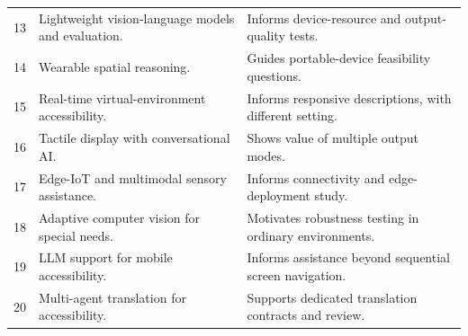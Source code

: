 \documentclass[12pt,a4paper,oneside]{report}
\begin{document}
\begin{longtable}{@{}p{}p{}p{}@{}}
13 \cite{baghel} & Lightweight vision-language models and evaluation. & Informs device-resource and output-quality tests.\\
14 \cite{magay} & Wearable spatial reasoning. & Guides portable-device feasibility questions.\\
15 \cite{cao} & Real-time virtual-environment accessibility. & Informs responsive descriptions, with different setting.\\
16 \cite{reinders} & Tactile display with conversational AI. & Shows value of multiple output modes.\\
17 \cite{raif} & Edge-IoT and multimodal sensory assistance. & Informs connectivity and edge-deployment study.\\
18 \cite{jebreen} & Adaptive computer vision for special needs. & Motivates robustness testing in ordinary environments.\\
19 \cite{ansah} & LLM support for mobile accessibility. & Informs assistance beyond sequential screen navigation.\\
20 \cite{mate} & Multi-agent translation for accessibility. & Supports dedicated translation contracts and review.\\
\bottomrule
\end{longtable}\endgroup
\end{document}
